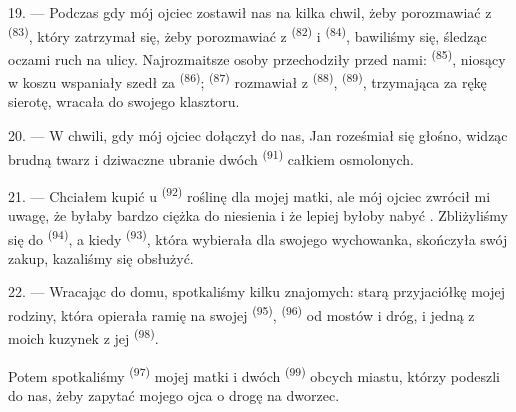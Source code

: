 19. --- Podczas gdy mój ojciec zostawił nas na kilka chwil, żeby porozmawiać z
 \textsuperscript{(83)}, który zatrzymał się, żeby
porozmawiać z  \textsuperscript{(82)} i 
\textsuperscript{(84)}, bawiliśmy się, śledząc oczami ruch na ulicy. Najrozmaitsze osoby
przechodziły przed nami:  \textsuperscript{(85)}, niosący
w koszu wspaniały  szedł za 
\textsuperscript{(86)};  \textsuperscript{(87)} rozmawiał z
 \textsuperscript{(88)},  \textsuperscript{(89)},
trzymająca za rękę sierotę, wracała do swojego klasztoru.

\VUsaut{3.0mm}

20. --- W chwili, gdy mój ojciec dołączył do nas, Jan roześmiał się głośno, widząc
brudną twarz i dziwaczne ubranie dwóch  \textsuperscript{(91)}
całkiem osmolonych.

21. --- Chciałem kupić u  \textsuperscript{(92)} roślinę dla mojej
matki, ale mój ojciec zwrócił mi uwagę, że byłaby bardzo ciężka do niesienia i że lepiej
byłoby nabyć . Zbliżyliśmy się do 
\textsuperscript{(94)}, a kiedy  \textsuperscript{(93)}, która
wybierała dla swojego wychowanka, skończyła swój zakup, kazaliśmy się obsłużyć.

22. --- Wracając do domu, spotkaliśmy kilku znajomych: starą przyjaciółkę mojej
rodziny, która opierała ramię na swojej 
\textsuperscript{(95)},  \textsuperscript{(96)} od mostów i dróg, i
jedną z moich kuzynek z jej  \textsuperscript{(98)}.

Potem spotkaliśmy  \textsuperscript{(97)} mojej matki i dwóch
 \textsuperscript{(99)} obcych miastu, którzy podeszli do nas, żeby
zapytać mojego ojca o drogę na dworzec.
\VUsaut{6.0mm}
\VUfilet{22mm}
